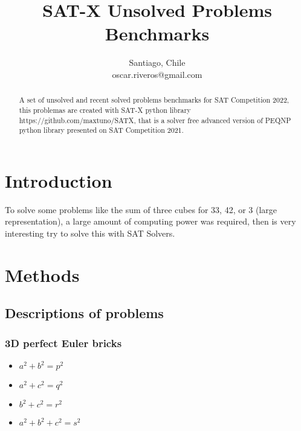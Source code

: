 \documentclass[conference]{IEEEtran}
\begin{document}
    \title{SAT-X Unsolved Problems Benchmarks\\
    }

    \author{
    Santiago, Chile \\
    oscar.riveros@gmail.com
    }

    \maketitle

    \begin{abstract}
        A set of unsolved and recent solved problems benchmarks for SAT Competition 2022, this problemas are created with SAT-X python library https://github.com/maxtuno/SATX, that is a solver free advanced version of PEQNP python library presented on SAT Competition 2021\cite{b1}.
    \end{abstract}


    \section{Introduction}
    To solve some problems like the sum of three cubes for 33, 42, or 3 (large representation), a large amount of computing power was required, then is very interesting try to solve this with SAT Solvers.


    \section{Methods}

    \subsection{Descriptions of problems}

    \subsubsection{3D perfect Euler bricks}

    \begin{itemize}
        \item $a^2 + b^2 = p^2$
        \item $a^2 + c^2 = q^2$
        \item $b^2 + c^2 = r^2$
        \item $a^2 + b^2 + c^2 = s^2$
    \end{itemize}
\end{document}
